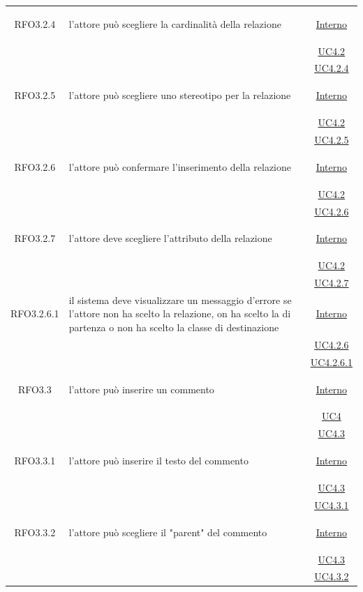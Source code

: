\begin{longtable}{|c|>{\centering}m{7cm}|c|}
\hypertarget{RFO3.2.4}{RFO3.2.4} & l'attore può scegliere la cardinalità della relazione & \hyperlink{Interno}{Interno}\\
& &\hyperref[UC4.2]{UC4.2}\\
& &\hyperref[UC4.2.4]{UC4.2.4}\\ \hline

\hypertarget{RFO3.2.5}{RFO3.2.5} & l'attore può scegliere uno stereotipo per la relazione & \hyperlink{Interno}{Interno}\\
& &\hyperref[UC4.2]{UC4.2}\\
& &\hyperref[UC4.2.5]{UC4.2.5}\\ \hline

\hypertarget{RFO3.2.6}{RFO3.2.6} & l'attore può confermare l'inserimento della relazione & \hyperlink{Interno}{Interno}\\
& &\hyperref[UC4.2]{UC4.2}\\
& &\hyperref[UC4.2.6]{UC4.2.6}\\ \hline

\hypertarget{RFO3.2.7}{RFO3.2.7} & l'attore deve scegliere l'attributo della relazione & \hyperlink{Interno}{Interno}\\
& &\hyperref[UC4.2]{UC4.2}\\
& &\hyperref[UC4.2.7]{UC4.2.7}\\ \hline

\hypertarget{RFO3.2.6.1}{RFO3.2.6.1} & il sistema deve visualizzare un messaggio d'errore se l'attore non ha scelto la relazione, on ha scelto la di partenza o non ha scelto la classe di destinazione &  \hyperlink{Interno}{Interno}\\
& &\hyperref[UC4.2.6]{UC4.2.6}\\
& &\hyperref[UC4.2.6.1]{UC4.2.6.1}\\ \hline

\hypertarget{RFO3.3}{RFO3.3} & l'attore può inserire un commento &  \hyperlink{Interno}{Interno}\\
& &\hyperref[UC4]{UC4}\\
& &\hyperref[UC4.3]{UC4.3}\\ \hline

\hypertarget{RFO3.3.1}{RFO3.3.1} & l'attore può inserire il testo del commento & \hyperlink{Interno}{Interno}\\
& &\hyperref[UC4.3]{UC4.3}\\
& &\hyperref[UC4.3.1]{UC4.3.1}\\ \hline

\hypertarget{RFO3.3.2}{RFO3.3.2} & l'attore può scegliere il "parent" del commento & \hyperlink{Interno}{Interno}\\
& &\hyperref[UC4.3]{UC4.3}\\
& &\hyperref[UC4.3.2]{UC4.3.2}\\ \hline


\end{longtable}
